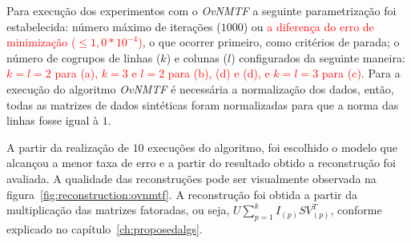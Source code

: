 \documentclass[
    12pt,                %
    oneside,            %
    a4paper,            %
    english,            %
    brazil                %
    ]{abntex2ppgsi}
\begin{document}

Para execução dos experimentos com o \textit{OvNMTF} a seguinte parametrização foi estabelecida: número máximo de iterações ($1000$) ou \textcolor{red}{a diferença do erro de minimização ($\leq 1,0*10^{-4}$)}, o que ocorrer primeiro, como critérios de parada; o número de cogrupos de linhas ($k$) e colunas ($l$) configurados da seguinte maneira: \textcolor{red}{$k = l = 2$ para (a), $k = 3$ e $l = 2 $ para (b), (d) e (d), e $k = l = 3$ para (c)}. Para a execução do algoritmo \textit{OvNMTF} é necessária a normalização dos dados, então, todas as matrizes de dados sintéticas foram normalizadas para que a norma das linhas fosse igual à $1$.



A partir da realização de $10$ execuções do algoritmo, foi escolhido o modelo que alcançou a menor taxa de erro e a partir do resultado obtido a reconstrução foi avaliada. A qualidade das reconstruções pode ser visualmente observada na figura~\ref{fig:reconstruction:ovnmtf}. A reconstrução foi obtida a partir da multiplicação das matrizes fatoradas, ou seja, $U \sum_{p=1}^{k} I_{(p)} S V_{(p)}^T$, conforme explicado no capítulo~\ref{ch:proposedalgs}.
\end{document}
